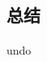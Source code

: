 \documentclass{article}
\begin{document}
\begin{CJK}{UTF8}{gkai}
\section{总结} %
	\paragraph{}
		undo

\end{CJK}
\end{document}

